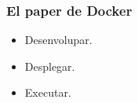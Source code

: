 \begin{frame}
  \frametitle{El paper de Docker}
  \begin{itemize}
  	\item Desenvolupar.
  	\item Desplegar.
  	\item Executar.
  \end{itemize}
\end{frame}

